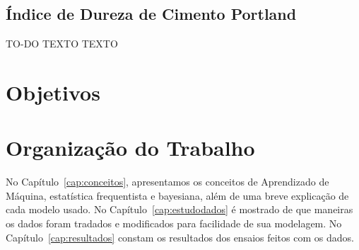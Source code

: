 \subsection{Índice de Dureza de Cimento Portland}

TO-DO TEXTO TEXTO 

\section{Objetivos}
\label{sec:objetivo}


\section{Organização do Trabalho}
\label{sec:organizacao_trabalho}

No Capítulo~\ref{cap:conceitos}, apresentamos os conceitos de Aprendizado de
Máquina, estatística frequentista e bayesiana, além de uma breve explicação
de cada modelo usado. No Capítulo~\ref{cap:estudodados} é mostrado de que
maneiras os dados foram tradados e modificados para facilidade de sua modelagem.
No Capítulo~\ref{cap:resultados} constam os resultados dos ensaios feitos com os dados. 



